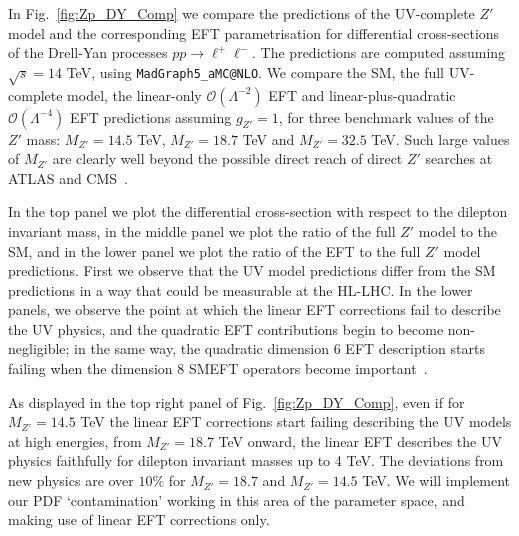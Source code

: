 \documentclass[withindex,glossary]{cam-thesis}
\makeatletter
\newcommand{\madgraph}{\texttt{MadGraph5\_aMC@NLO}{}}
\makeatother
\begin{document}
In Fig.~\ref{fig:Zp_DY_Comp} we compare the predictions of the UV-complete $Z'$ model and the corresponding EFT parametrisation
for differential cross-sections of the Drell-Yan processes $p p \rightarrow \ell^+ \ell^-$.
The predictions are computed assuming $\sqrt{s}=14$ TeV, using \madgraph{}. 
We compare the SM, the full UV-complete model, the linear-only $\mathcal{O}(\Lambda^{-2})$ EFT and linear-plus-quadratic $\mathcal{O}(\Lambda^{-4})$ EFT predictions 
assuming $g_{Z'} = 1$, for 
three benchmark values of the $Z'$ mass: $M_{Z'} = 14.5$ TeV, $M_{Z'} = 18.7$ TeV and $M_{Z'} = 32.5$ TeV.
Such large values of $M_{Z'}$ are clearly well beyond the possible direct reach of direct $Z'$ searches at ATLAS and CMS~\cite{Workman:2022ynf}.

In the top panel we plot the differential cross-section with respect to the dilepton invariant mass, 
in the middle panel we plot the ratio of the full $Z'$ model to the SM, and in the
lower panel we plot the ratio of the EFT to the full $Z'$ model predictions. 
%
First we observe that the UV model predictions differ from the SM predictions in a way that could be measurable at the HL-LHC. 
In the lower panels, we observe the point at which the linear EFT corrections fail to describe the UV physics, and the quadratic EFT contributions begin to become non-negligible; in the same way, the quadratic dimension 6 EFT description starts failing when the dimension 8 SMEFT operators become important~\cite{Boughezal:2021tih}.

As displayed in the top right panel of Fig.~\ref{fig:Zp_DY_Comp}, even if for $M_{Z'}=14.5$ TeV the linear EFT corrections start failing describing the UV models at high energies, from $M_{Z'}=18.7$ TeV onward, the linear EFT describes the UV physics faithfully for dilepton invariant masses up to 4 TeV. The deviations from new physics are over $10\%$ for $M_{Z'}=18.7$ and $M_{Z'}=14.5$ TeV.
We will implement our PDF `contamination' working in this area of the parameter space,
and making use of linear EFT corrections only.
\end{document}
